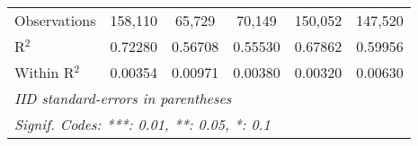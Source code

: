 \begin{table}[htbp]
\begin{tabular}{lccccc}
      Observations         & 158,110         & 65,729          & 70,149          & 150,052         & 147,520\\
      R$^2$                & 0.72280         & 0.56708         & 0.55530         & 0.67862         & 0.59956\\
      Within R$^2$         & 0.00354         & 0.00971         & 0.00380         & 0.00320         & 0.00630\\
      \midrule\midrule\multicolumn{6}{l}{\emph{IID standard-errors in parentheses}}\\
      \multicolumn{6}{l}{\emph{Signif. Codes: ***: 0.01, **: 0.05, *: 0.1}}\\
   \end{tabular}
\end{table}


